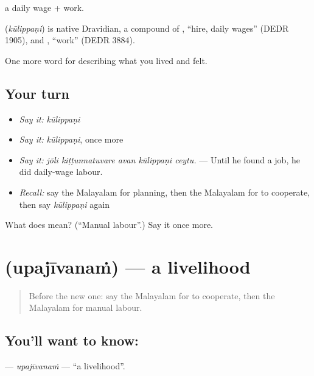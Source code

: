  a daily wage +  work.

\begin{cousinweb}
\textbf{} (\emph{kūlippaṇi}) is native Dravidian, a compound of , \textquotedblleft{}hire, daily wages\textquotedblright{} (DEDR 1905), and , \textquotedblleft{}work\textquotedblright{} (DEDR 3884).
\end{cousinweb}

\begin{grammarlens}[title={What you've built}]
One more word for describing what you lived and felt.
\end{grammarlens}

\subsection*{Your turn}
\begin{itemize}
\raggedright
  \item \emph{Say it:} \emph{kūlippaṇi}
  \item \emph{Say it:} \emph{kūlippaṇi}, once more
  \item \emph{Say it:} \emph{jōli kiṭṭunnatuvare avan kūlippaṇi ceytu.} — Until he found a job, he did daily-wage labour.
  \item \emph{Recall:} say the Malayalam for planning, then the Malayalam for to cooperate, then say \emph{kūlippaṇi} again
\end{itemize}

\begin{tcolorbox}[breakable,colback=teal!4,colframe=teal!35!black,title={Before you move on}]
What does  mean? (\textquotedblleft{}Manual labour\textquotedblright{}.) Say it once more.
\end{tcolorbox}
\section[\texorpdfstring{\ml{ഉപജീവനം} (upajīvanaṁ)}{ഉപജീവനം (upajīvanaṁ)}]{ (upajīvanaṁ) — a livelihood}

\label{lesson:ML-C546-upajivanam}



\begin{quote}
Before the new one: say the Malayalam for to cooperate, then the Malayalam for manual labour.
\end{quote}

\subsection*{You'll want to know: }
\textbf{} — \emph{upajīvanaṁ} — \textquotedblleft{}a livelihood\textquotedblright{}.

